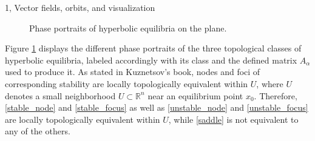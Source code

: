 \documentclass[10pt,a4paper]{article}
\begin{document}
\begin{task}{1, Vector fields, orbits, and visualization}
\begin{figure} [H]
    \centering
    \caption{Phase portraits of hyperbolic equilibria on the plane.}
    \label{phase_portraits}
\end{figure}

Figure \ref{phase_portraits} displays the different phase portraits of the three topological classes of hyperbolic equilibria, labeled accordingly with its class and the defined matrix $A_{\alpha}$ used to produce it. As stated in Kuznetsov's book, nodes and foci of corresponding stability are locally topologically equivalent within $U$, where $U$ denotes a small neighborhood $U\subset\mathbb{R}^{n}$ near an equilibrium point $x_0$. Therefore, \ref{stable_node} and \ref{stable_focus} as well as \ref{unstable_node} and \ref{unstable_focus} are locally topologically equivalent within $U$, while \ref{saddle} is not equivalent to any of the others.

\end{task}
\end{document}

